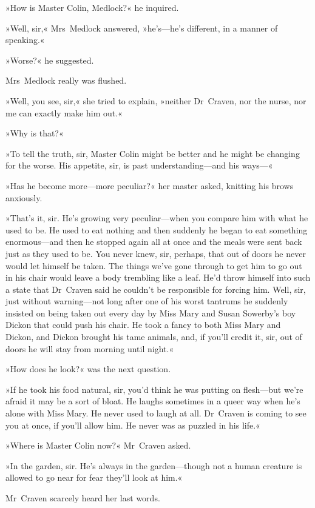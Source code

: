 »How is Master Colin, Medlock?« he inquired.

»Well, sir,« Mrs~Medlock answered, »he's—he's different, in a manner of speaking.«

»Worse?« he suggested.

Mrs~Medlock really was flushed.

»Well, you see, sir,« she tried to explain, »neither Dr~Craven, nor the nurse, nor me can exactly make him out.«

»Why is that?«

»To tell the truth, sir, Master Colin might be better and he might be changing for the worse. His appetite, sir, is past understanding—and his ways—«

»Has he become more—more peculiar?« her master asked, knitting his brows anxiously.

»That's it, sir. He's growing very peculiar—when you compare him with what he used to be. He used to eat nothing and then suddenly he began to eat something enormous—and then he stopped again all at once and the meals were sent back just as they used to be. You never knew, sir, perhaps, that out of doors he never would let himself be taken. The things we've gone through to get him to go out in his chair would leave a body trembling like a leaf. He'd throw himself into such a state that Dr~Craven said he couldn't be responsible for forcing him. Well, sir, just without warning—not long after one of his worst tantrums he suddenly insisted on being taken out every day by Miss Mary and Susan Sowerby's boy Dickon that could push his chair. He took a fancy to both Miss Mary and Dickon, and Dickon brought his tame animals, and, if you'll credit it, sir, out of doors he will stay from morning until night.«

»How does he look?« was the next question.

»If he took his food natural, sir, you'd think he was putting on flesh—but we're afraid it may be a sort of bloat. He laughs sometimes in a queer way when he's alone with Miss Mary. He never used to laugh at all. Dr~Craven is coming to see you at once, if you'll allow him. He never was as puzzled in his life.«

»Where is Master Colin now?« Mr~Craven asked.

»In the garden, sir. He's always in the garden—though not a human creature is allowed to go near for fear they'll look at him.«

Mr~Craven scarcely heard her last words.

